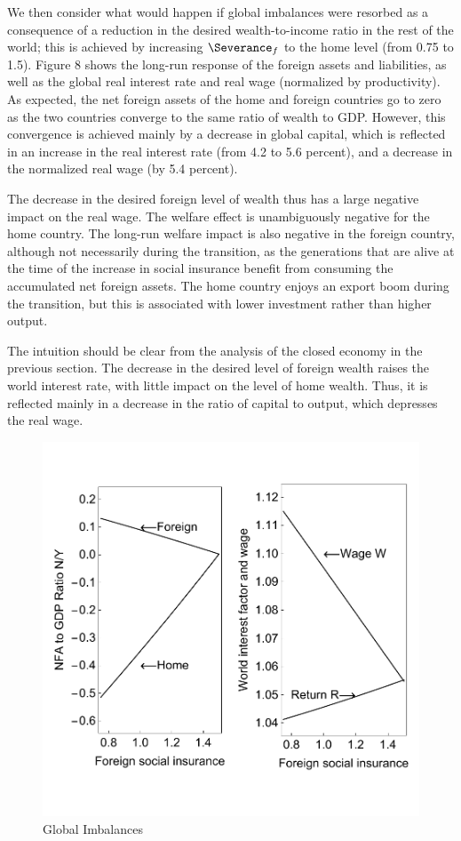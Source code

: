 \documentclass[titlepage]{\econtex}\newcommand{\texname}{cjSOE}
\begin{document}
We then consider what would happen if global imbalances were resorbed
as a consequence of a reduction in the desired wealth-to-income ratio in the rest of the
world; this is achieved by increasing $\Severance_f$ to the home level (from 0.75 to
1.5). Figure 8 shows the long-run response of the foreign assets and
liabilities, as well as the global real interest rate and real wage
(normalized by productivity). As expected, the net foreign assets of
the home and foreign countries go to zero as the two countries
converge to the same ratio of wealth to GDP. However, this convergence
is achieved mainly by a decrease in global capital, which is reflected
in an increase in the real interest rate (from 4.2 to 5.6 percent),
and a decrease in the normalized real wage (by 5.4 percent).

The decrease in the desired foreign level of wealth thus has a large negative impact on the real wage. The welfare effect is unambiguously negative for the home country. The long-run welfare impact is also negative in the foreign country, although not necessarily during the transition, as the generations that are alive at the time of the increase in social insurance benefit from consuming the accumulated net foreign assets. The home country enjoys an export boom during the transition, but this is associated with lower investment rather than higher output.

The intuition should be clear from the analysis of the closed economy in the previous section. The decrease in the desired level of foreign wealth raises the world interest rate, with little impact on the level of home wealth. Thus, it is reflected mainly in a decrease in the ratio of capital to output, which depresses the real wage.

\medskip
\begin{figure}
\includegraphics{./Figures/globImb}
\caption{Global Imbalances}\label{fig:globImb}
\end{figure}
\medskip
\end{document}
